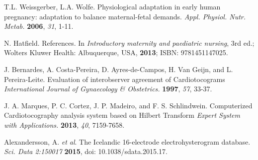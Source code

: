\documentclass[bioengineering,article,submit,moreauthors,pdftex,10pt,a4paper]{mdpi}
\begin{document}
\begin{thebibliography}{999}
	
T.L. Weissgerber, L.A. Wolfe. Physiological adaptation in early human pregnancy: adaptation to balance maternal-fetal demands. {\em Appl. Physiol. Nutr. Metab.} {\bf 2006}, {\em 31}, 1-11.

N. Hatfield. References. In {\em Introductory maternity and paediatric nursing}, 3rd ed.; Wolters Kluwer Health: Albuquerque, USA, {\bf 2013}; ISBN: 9781451147025.		

J. Bernardes, A. Costa-Pereira, D. Ayres-de-Campos, H. Van Geijn, and L. Pereira-Leite. Evaluation of interobserver agreement of Cardiotocograms {\em International Journal of Gynaecology \& Obstetrics.} {\bf 1997}, {\em 57}, 33-37.

J. A. Marques, P. C. Cortez, J. P. Madeiro, and F. S. Schlindwein. Computerized Cardiotocography analysis system based on Hilbert Transform {\em Expert System with Applications.} {\bf 2013}, {\em 40}, 7159-7658.		
	
Alexandersson, A. { \em et al}.  The Icelandic 16-electrode electrohysterogram database. {\em Sci. Data 2:150017} {\bf 2015}, doi: 10.1038/sdata.2015.17.


	





\end{thebibliography}


%


\end{document}

